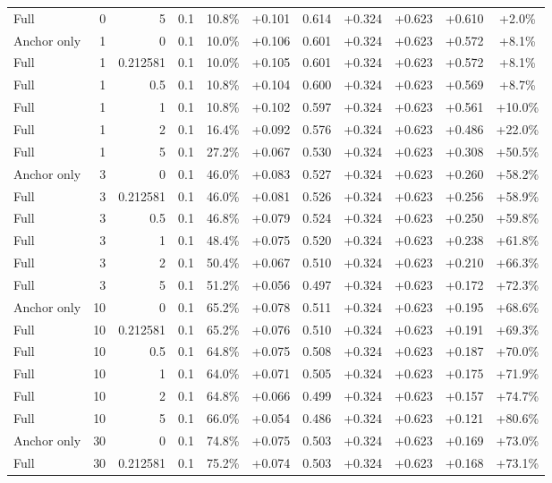 \begin{table}[htbp]
\begin{tabular}{lrrrccccccc}
Full & 0 & 5 & 0.1 & 10.8\% & +0.101 & 0.614 & +0.324 & +0.623 & +0.610 & +2.0\% \\
Anchor only & 1 & 0 & 0.1 & 10.0\% & +0.106 & 0.601 & +0.324 & +0.623 & +0.572 & +8.1\% \\
Full & 1 & 0.212581 & 0.1 & 10.0\% & +0.105 & 0.601 & +0.324 & +0.623 & +0.572 & +8.1\% \\
Full & 1 & 0.5 & 0.1 & 10.8\% & +0.104 & 0.600 & +0.324 & +0.623 & +0.569 & +8.7\% \\
Full & 1 & 1 & 0.1 & 10.8\% & +0.102 & 0.597 & +0.324 & +0.623 & +0.561 & +10.0\% \\
Full & 1 & 2 & 0.1 & 16.4\% & +0.092 & 0.576 & +0.324 & +0.623 & +0.486 & +22.0\% \\
Full & 1 & 5 & 0.1 & 27.2\% & +0.067 & 0.530 & +0.324 & +0.623 & +0.308 & +50.5\% \\
Anchor only & 3 & 0 & 0.1 & 46.0\% & +0.083 & 0.527 & +0.324 & +0.623 & +0.260 & +58.2\% \\
Full & 3 & 0.212581 & 0.1 & 46.0\% & +0.081 & 0.526 & +0.324 & +0.623 & +0.256 & +58.9\% \\
Full & 3 & 0.5 & 0.1 & 46.8\% & +0.079 & 0.524 & +0.324 & +0.623 & +0.250 & +59.8\% \\
Full & 3 & 1 & 0.1 & 48.4\% & +0.075 & 0.520 & +0.324 & +0.623 & +0.238 & +61.8\% \\
Full & 3 & 2 & 0.1 & 50.4\% & +0.067 & 0.510 & +0.324 & +0.623 & +0.210 & +66.3\% \\
Full & 3 & 5 & 0.1 & 51.2\% & +0.056 & 0.497 & +0.324 & +0.623 & +0.172 & +72.3\% \\
Anchor only & 10 & 0 & 0.1 & 65.2\% & +0.078 & 0.511 & +0.324 & +0.623 & +0.195 & +68.6\% \\
Full & 10 & 0.212581 & 0.1 & 65.2\% & +0.076 & 0.510 & +0.324 & +0.623 & +0.191 & +69.3\% \\
Full & 10 & 0.5 & 0.1 & 64.8\% & +0.075 & 0.508 & +0.324 & +0.623 & +0.187 & +70.0\% \\
Full & 10 & 1 & 0.1 & 64.0\% & +0.071 & 0.505 & +0.324 & +0.623 & +0.175 & +71.9\% \\
Full & 10 & 2 & 0.1 & 64.8\% & +0.066 & 0.499 & +0.324 & +0.623 & +0.157 & +74.7\% \\
Full & 10 & 5 & 0.1 & 66.0\% & +0.054 & 0.486 & +0.324 & +0.623 & +0.121 & +80.6\% \\
Anchor only & 30 & 0 & 0.1 & 74.8\% & +0.075 & 0.503 & +0.324 & +0.623 & +0.169 & +73.0\% \\
Full & 30 & 0.212581 & 0.1 & 75.2\% & +0.074 & 0.503 & +0.324 & +0.623 & +0.168 & +73.1\% \\

\end{tabular}
\end{table}
